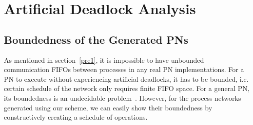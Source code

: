 \documentclass{sig-alternate}
\begin{document}

\section{Artificial Deadlock Analysis}
\label{deadlock}
\subsection{Boundedness of the Generated PNs}
As mentioned in section~\ref{pre1}, it is impossible to have unbounded communication FIFOs between processes in any real PN implementations. For a PN to execute without experiencing artificial deadlocks, it has to be bounded, i.e. certain schedule of the network only requires finite FIFO space.
For a general PN, its boundedness is an undecidable problem~\cite{parks1995bounded}. However, for the process networks generated using our scheme, 
we can easily show their boundedness by constructively creating a schedule of operations.
\end{document}
